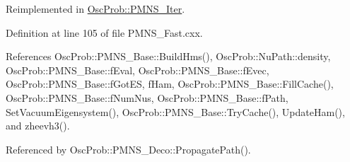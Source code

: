 Reimplemented in \hyperlink{classOscProb_1_1PMNS__Iter_a0a4a4af377f11e8d4c681c17ced7c9e9}{Osc\+Prob\+::\+P\+M\+N\+S\+\_\+\+Iter}.



Definition at line 105 of file P\+M\+N\+S\+\_\+\+Fast.\+cxx.



References Osc\+Prob\+::\+P\+M\+N\+S\+\_\+\+Base\+::\+Build\+Hms(), Osc\+Prob\+::\+Nu\+Path\+::density, Osc\+Prob\+::\+P\+M\+N\+S\+\_\+\+Base\+::f\+Eval, Osc\+Prob\+::\+P\+M\+N\+S\+\_\+\+Base\+::f\+Evec, Osc\+Prob\+::\+P\+M\+N\+S\+\_\+\+Base\+::f\+Got\+ES, f\+Ham, Osc\+Prob\+::\+P\+M\+N\+S\+\_\+\+Base\+::\+Fill\+Cache(), Osc\+Prob\+::\+P\+M\+N\+S\+\_\+\+Base\+::f\+Num\+Nus, Osc\+Prob\+::\+P\+M\+N\+S\+\_\+\+Base\+::f\+Path, Set\+Vacuum\+Eigensystem(), Osc\+Prob\+::\+P\+M\+N\+S\+\_\+\+Base\+::\+Try\+Cache(), Update\+Ham(), and zheevh3().



Referenced by Osc\+Prob\+::\+P\+M\+N\+S\+\_\+\+Deco\+::\+Propagate\+Path().


